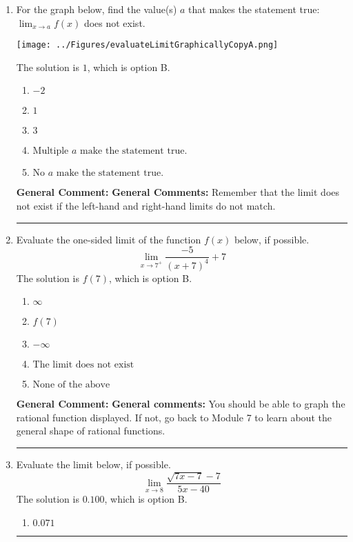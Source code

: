 \documentclass{extbook}[14pt]
\newcommand{\litem}[1]{\item #1

\rule{\textwidth}{0.4pt}}
\begin{document}
\begin{enumerate}\litem{
For the graph below, find the value(s) $a$ that makes the statement true: $ \displaystyle \lim_{x \rightarrow a} f(x)$ does not exist.

\begin{center}
    \texttt{[image: ../Figures/evaluateLimitGraphicallyCopyA.png]}
\end{center}


The solution is \( 1 \), which is option B.\begin{enumerate}[label=\Alph*.]
\item \( -2 \)


\item \( 1 \)


\item \( 3 \)


\item \( \text{Multiple } a \text{ make the statement true}. \)


\item \( \text{No } a \text{ make the statement true}. \)


\end{enumerate}

\textbf{General Comment:} \textbf{General Comments:} Remember that the limit does not exist if the left-hand and right-hand limits do not match.
}
\litem{
Evaluate the one-sided limit of the function $f(x)$ below, if possible.
\[ \lim_{x \rightarrow 7^+} \frac{-5}{(x+7)^4}+7 \]The solution is \( f(7) \), which is option B.\begin{enumerate}[label=\Alph*.]
\item \( \infty \)


\item \( f(7) \)


\item \( -\infty \)


\item \( \text{The limit does not exist} \)


\item \( \text{None of the above} \)


\end{enumerate}

\textbf{General Comment:} \textbf{General comments:} You should be able to graph the rational function displayed. If not, go back to Module 7 to learn about the general shape of rational functions.
}
\litem{
Evaluate the limit below, if possible.
\[ \lim_{x \rightarrow 8} \frac{\sqrt{7x - 7} - 7}{5x - 40} \]The solution is \( 0.100 \), which is option B.\begin{enumerate}[label=\Alph*.]
\item \( 0.071 \)


\end{enumerate}}
\end{enumerate}
\end{document}

